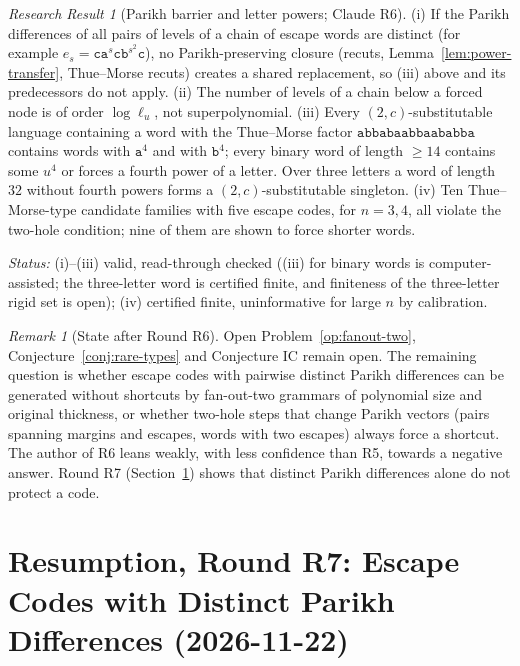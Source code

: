 \documentclass[11pt]{article}
\numberwithin{equation}{section}
\theoremstyle{plain}
\theoremstyle{definition}
\theoremstyle{remark}
\newtheorem{remark}[theorem]{Remark}
\newtheorem{rresult}[theorem]{Research Result}
\theoremstyle{plain}
\begin{document}
\begin{rresult}[Parikh barrier and letter powers; Claude R6]
\label{rr:R6-parikh}
(i) If the Parikh differences of all pairs of levels of a chain of escape words are
distinct (for example $e_s=\mathtt c\mathtt a^s\mathtt c\mathtt b^{s^2}\mathtt c$), no
Parikh-preserving closure (recuts, Lemma~\ref{lem:power-transfer}, Thue--Morse recuts)
creates a shared replacement, so (iii) above and its predecessors do not apply.
(ii) The number of levels of a chain below a forced node is of order
$\log\ell_u$, not superpolynomial.
(iii) Every $(2,c)$-substitutable language containing a word with the Thue--Morse factor
$\mathtt{abbabaabbaababba}$ contains words with $\mathtt a^4$ and with $\mathtt b^4$;
every binary word of length $\ge14$ contains some $u^4$ or forces a fourth power of a
letter.  Over three letters a word of length $32$ without fourth powers forms a
$(2,c)$-substitutable singleton.
(iv) Ten Thue--Morse-type candidate families with five escape codes, for $n=3,4$, all
violate the two-hole condition; nine of them are shown to force shorter words.
\end{rresult}
\noindent\emph{Status:} (i)--(iii) valid, read-through checked ((iii) for binary words is
computer-assisted; the three-letter word is certified finite, and finiteness of the
three-letter rigid set is open); (iv) certified finite, uninformative for large $n$ by
calibration.

\begin{remark}[State after Round R6]
\label{rem:R6-state}
Open Problem~\ref{op:fanout-two}, Conjecture~\ref{conj:rare-types} and Conjecture IC remain
open.  The remaining question is whether escape codes with pairwise distinct Parikh
differences can be generated without shortcuts by fan-out-two grammars of polynomial size
and original thickness, or whether two-hole steps that change Parikh vectors (pairs spanning
margins and escapes, words with two escapes) always force a shortcut.  The author of R6
leans weakly, with less confidence than R5, towards a negative answer.  Round R7
(Section~\ref{sec:p4-resume-R7}) shows that distinct Parikh differences alone do not
protect a code.
\end{remark}

\section{Resumption, Round R7: Escape Codes with Distinct Parikh Differences (2026-11-22)}
\label{sec:p4-resume-R7}
\end{document}
